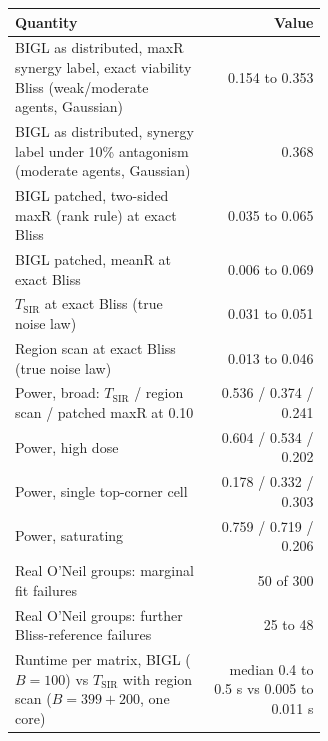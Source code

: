 \begin{tabular}{@{}p{0.62\linewidth}r@{}}
\toprule
Quantity & Value\\
\midrule
BIGL as distributed, maxR synergy label, exact viability Bliss (weak/moderate agents, Gaussian) & 0.154 to 0.353\\
BIGL as distributed, synergy label under 10\% antagonism (moderate agents, Gaussian) & 0.368\\
BIGL patched, two-sided maxR (rank rule) at exact Bliss & 0.035 to 0.065\\
BIGL patched, meanR at exact Bliss & 0.006 to 0.069\\
$T_{\mathrm{SIR}}$ at exact Bliss (true noise law) & 0.031 to 0.051\\
Region scan at exact Bliss (true noise law) & 0.013 to 0.046\\
Power, broad: $T_{\mathrm{SIR}}$ / region scan / patched maxR at 0.10 & 0.536 / 0.374 / 0.241\\
Power, high dose & 0.604 / 0.534 / 0.202\\
Power, single top-corner cell & 0.178 / 0.332 / 0.303\\
Power, saturating & 0.759 / 0.719 / 0.206\\
Real O'Neil groups: marginal fit failures & 50 of 300\\
Real O'Neil groups: further Bliss-reference failures & 25 to 48\\
Runtime per matrix, BIGL ($B=100$) vs $T_{\mathrm{SIR}}$ with region scan ($B=399+200$, one core) & median 0.4 to 0.5 s vs 0.005 to 0.011 s\\
\bottomrule
\end{tabular}

